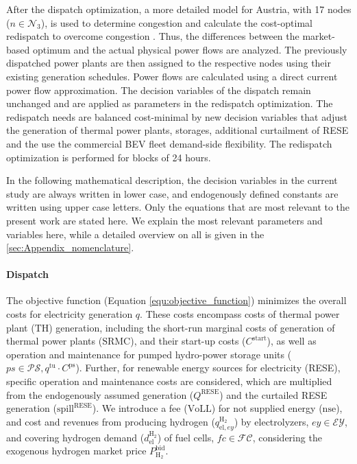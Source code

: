 \documentclass[final,10pt]{elsarticle}
\begin{document}
        After the dispatch optimization, a more detailed model for Austria, with 17 nodes ($n \in \mathcal{N}_3$), is used to determine congestion and calculate the cost-optimal redispatch to overcome congestion . Thus, the differences between the market-based optimum and the actual physical power flows are analyzed.
        The previously dispatched power plants are then assigned to the respective nodes using their existing generation schedules. Power flows are calculated using a direct current power flow approximation. The decision variables of the dispatch remain unchanged and are applied as parameters in the redispatch optimization. The redispatch needs are balanced cost-minimal by new decision variables that adjust the generation of thermal power plants, storages, additional curtailment of \ac{RESE} and the use the commercial \ac{BEV} fleet demand-side flexibility. The redispatch optimization is performed for blocks of 24 hours. 

        In the following mathematical description, the decision variables in the current study are always written in lower case, and endogenously defined constants are written using upper case letters. Only the equations that are most relevant to the present work are stated here. We explain the most relevant parameters and variables here, while a detailed overview on all is given in the \ref{sec:Appendix_nomenclature}.

        \paragraph{Dispatch} 
            The objective function (Equation \ref{equ:objective_function}) minimizes the overall costs for electricity generation $q$. These costs encompass costs of thermal power plant ($\mathrm{TH}$) generation, including the short-run marginal costs of generation of thermal power plants ($\mathrm{SRMC}$), and their start-up costs ($C^{\mathrm{start}}$), as well as operation and maintenance for pumped hydro-power storage units ($ps \in \mathcal{PS}, q^{\mathrm{tu}} \cdot C^{\mathrm{ps}}$). Further, for renewable energy sources for electricity (RESE), specific operation and maintenance costs are considered, which are multiplied from the endogenously assumed generation ($Q^{\mathrm{RESE}}$) and the curtailed RESE generation ($\mathrm{spill}^{\mathrm{RESE}}$). We introduce a fee ($\mathrm{VoLL}$) for not supplied energy ($\mathrm{nse}$), and cost and revenues from producing hydrogen ($q^{\mathrm{H_2}}_{\mathrm{el},ey}$) by electrolyzers, $ey \in \mathcal{EY}$, and covering hydrogen demand ($d^{\mathrm{H_2}}_{\mathrm{el}}$) of fuel cells, $fc \in \mathcal{FC}$, considering the exogenous hydrogen market price $P^\mathrm{bid}_{\mathrm{H_2}}$.
\end{document}

